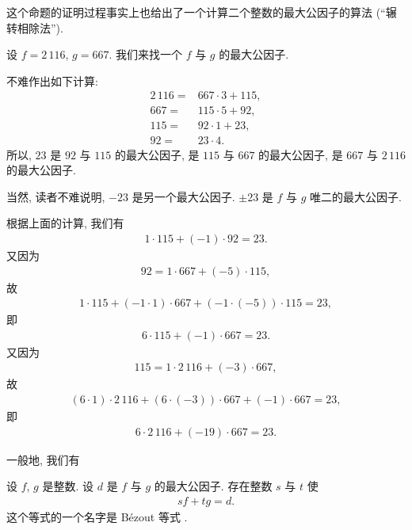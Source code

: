 这个命题的证明过程事实上也给出了一个计算二个整数的最大公因子的算法 (``辗转相除法'').

\begin{example}
    设 $f = 2\,116$, $g = 667$. 我们来找一个 $f$ 与 $g$ 的最大公因子.

    不难作出如下计算:
    \begin{align*}
        2\,116 = {} & 667 \cdot 3 + 115, \\
        667    = {} & 115 \cdot 5 + 92,  \\
        115    = {} & 92 \cdot 1 + 23,   \\
        92     = {} & 23 \cdot 4.
    \end{align*}
    所以, $23$ 是 $92$ 与 $115$ 的最大公因子, 是 $115$ 与 $667$ 的最大公因子, 是 $667$ 与 $2\,116$ 的最大公因子.

    当然, 读者不难说明, $-23$ 是另一个最大公因子. $\pm 23$ 是 $f$ 与 $g$ 唯二的最大公因子.
\end{example}

根据上面的计算, 我们有
\begin{align*}
    1 \cdot 115 + (-1) \cdot 92 = 23.
\end{align*}
又因为
\begin{align*}
    92 = 1 \cdot 667 + (-5) \cdot 115,
\end{align*}
故
\begin{align*}
    1 \cdot 115 + (-1 \cdot 1) \cdot 667 + (-1 \cdot (-5)) \cdot 115 = 23,
\end{align*}
即
\begin{align*}
    6 \cdot 115 + (-1) \cdot 667 = 23.
\end{align*}
又因为
\begin{align*}
    115 = 1 \cdot 2\,116 + (-3) \cdot 667,
\end{align*}
故
\begin{align*}
    (6 \cdot 1) \cdot 2\,116 + (6 \cdot (-3)) \cdot 667 + (-1) \cdot 667 = 23,
\end{align*}
即
\begin{align*}
    6 \cdot 2\,116 + (-19) \cdot 667 = 23.
\end{align*}

一般地, 我们有
\begin{proposition}
    设 $f$, $g$ 是整数. 设 $d$ 是 $f$ 与 $g$ 的最大公因子. 存在整数 $s$ 与 $t$ 使
    \begin{align*}
        sf + tg = d.
    \end{align*}
    这个等式的一个名字是 Bézout 等式 .
\end{proposition}

